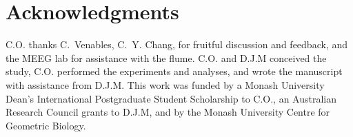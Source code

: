 \documentclass{article}
\begin{document}
\section*{Acknowledgments}
C.O. thanks C.~Venables, C.~Y. Chang, for fruitful discussion and feedback, and the MEEG lab for assistance with the flume. C.O. and D.J.M conceived the study, C.O. performed the experiments and analyses, and wrote the manuscript with assistance from D.J.M. This work was funded by a Monash University Dean's International Postgraduate Student Scholarship to C.O., an Australian Research Council grants to D.J.M, and by the Monash University Centre for Geometric Biology.

\newpage{}





\end{document}
